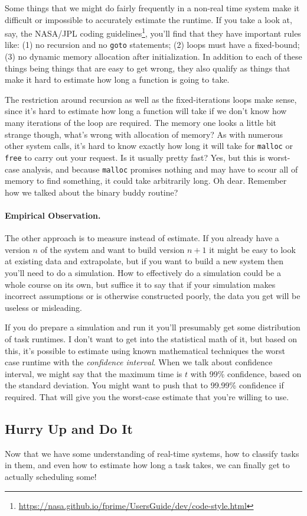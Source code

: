 Some things that we might do fairly frequently in a non-real time system make it difficult or impossible to accurately estimate the runtime. If you take a look at, say, the NASA/JPL coding guidelines\footnote{\url{https://nasa.github.io/fprime/UsersGuide/dev/code-style.html}}, you'll find that they have important rules like: (1) no recursion and no \texttt{goto} statements; (2) loops must have a fixed-bound; (3) no dynamic memory allocation after initialization. In addition to each of these things being things that are easy to get wrong, they also qualify as things that make it hard to estimate how long a function is going to take.

The restriction around recursion as well as the fixed-iterations loops make sense, since it's hard to estimate how long a function will take if we don't know how many iterations of the loop are required. The memory one looks a little bit strange though, what's wrong with allocation of memory? As with numerous other system calls, it's hard to know exactly how long it will take for \texttt{malloc} or \texttt{free} to carry out your request. Is it usually pretty fast? Yes, but this is worst-case analysis, and because \texttt{malloc} promises nothing and may have to scour all of memory to find something, it could take arbitrarily long. Oh dear. Remember how we talked about the binary buddy routine?

\paragraph{Empirical Observation.}
The other approach is to measure instead of estimate. If you already have a version $n$ of the system and want to build version $n+1$ it might be easy to look at existing data and extrapolate, but if you want to build a new system then you'll need to do a simulation. How to effectively do a simulation could be a whole course on its own, but suffice it to say that if your simulation makes incorrect assumptions or is otherwise constructed poorly, the data you get will be useless or misleading. 

If you do prepare a simulation and run it you'll presumably get some distribution of task runtimes. I don't want to get into the statistical math of it, but based on this, it's possible to estimate using known mathematical techniques the worst case runtime with the \textit{confidence interval}. When we talk about confidence interval, we might say that the maximum time is $t$ with 99\% confidence, based on the standard deviation. You might want to push that to 99.99\% confidence if required. That will give you the worst-case estimate that you're willing to use. 

\subsection*{Hurry Up and Do It}
Now that we have some understanding of real-time systems, how to classify tasks in them, and even how to estimate how long a task takes, we can finally get to actually scheduling some!




